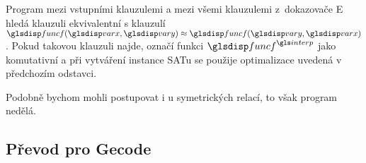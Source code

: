 Program \crossbow{} mezi vstupními klauzulemi a mezi všemi
klauzulemi z~dokazovače E hledá klauzuli ekvivalentní
s klauzulí $\func(\var, \varY) \approx \func(\varY, \var)$.
Pokud takovou klauzuli najde, označí funkci $\func^\interp$
jako komutativní a při vytváření instance SATu se použije
optimalizace uvedená v předchozím odstavci.

Podobně bychom mohli postupovat i u symetrických relací,
to však program \crossbow{} nedělá.

\subsection{Převod pro Gecode}

{
\def\Eq{\textproc{Eq}}
\def\LowerEq{\textproc{Lower-Eq}}
\def\Clause{\textproc{Clause}}
\def\Element{\textproc{Element}}
\def\Linear{\textproc{Linear}}
\def\Precede{\textproc{Precede}}

}
